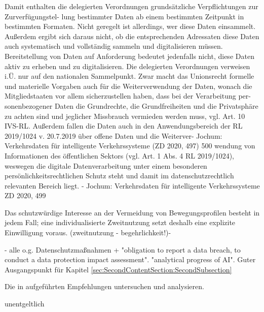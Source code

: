 Damit enthalten die delegierten Verordnungen grundsätzliche Verpflichtungen zur Zurverfügungstel- lung bestimmter Daten ab einem bestimmten Zeitpunkt in bestimmten Formaten. Nicht geregelt ist allerdings, wer diese Daten einsammelt. Außerdem ergibt sich daraus nicht, ob die entsprechenden Adressaten diese Daten auch systematisch und vollständig sammeln und digitalisieren müssen. Bereitstellung von Daten auf Anforderung bedeutet jedenfalls nicht, diese Daten aktiv zu erheben und zu digitalisieren. Die delegierten Verordnungen verweisen i.Ü. nur auf den nationalen Sammelpunkt. Zwar macht das Unionsrecht formelle und materielle Vorgaben auch für die Weiterverwendung der Daten, wonach die Mitgliedstaaten vor allem sicherzustellen haben, dass bei der Verarbeitung per- sonenbezogener Daten die Grundrechte, die Grundfreiheiten und die Privatsphäre zu achten sind und jeglicher Missbrauch vermieden werden muss, vgl. Art. 10 IVS-RL. Außerdem fallen die Daten auch in den Anwendungsbereich der RL 2019/1024 v. 20.7.2019 über offene Daten und die Weiterver-
Jochum: Verkehrsdaten für intelligente Verkehrssysteme (ZD 2020, 497) 500
wendung von Informationen des öffentlichen Sektors (vgl. Art. 1 Abs. 4 RL 2019/1024), weswegen die digitale Datenverarbeitung unter einem besonderen persönlichkeitsrechtlichen Schutz steht und damit im datenschutzrechtlich relevanten Bereich liegt.
- Jochum: Verkehrsdaten für intelligente Verkehrssysteme ZD 2020, 499

Das schutzwürdige Interesse an der Vermeidung von Bewegungsprofilen besteht in jedem Fall; eine individualisierte Zweitnutzung setzt deshalb eine explizite Einwilligung voraus. (zweitnutzung - begehrlichkeit!)- \cite{Weichert2016}

\cite{Seewald2018} - alle o.g. Datenschutzmaßnahmen + "obligation to report a data breach, to conduct a data protection impact assessment". "analytical progress of AI". Guter Ausgangspunkt für Kapitel \ref{sec:SecondContentSection:SecondSubsection}

Die in \cite{Kiometzis2017} aufgeführten Empfehlungen untersuchen und analysieren. 

unentgeltlich

